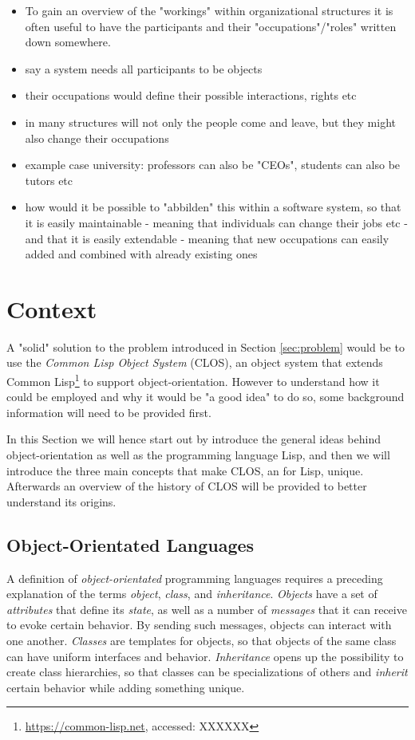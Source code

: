\documentclass[oribibl]{llncs}
\begin{document}
\begin{itemize}
\item To gain an overview of the "workings" within organizational structures it is often useful to have the participants and their "occupations"/"roles" written down somewhere. 
\item say a system needs all participants to be objects
\item their occupations would define their possible interactions, rights etc
\item in many structures will not only the people come and leave, but they might also change their occupations
\item example case university: professors can also be "CEOs", students can also be tutors etc
\item how would it be possible to "abbilden" this within a software system, so that it is easily maintainable - meaning that individuals can change their jobs etc - and that it is easily extendable - meaning that new occupations can easily added and combined with already existing ones
\end{itemize}


\section{Context}
\label{sec:context}
A "solid" solution to the problem introduced in Section \ref{sec:problem} would be to use the \emph{Common Lisp Object System} (CLOS), an object system that extends Common Lisp\footnote{\url{https://common-lisp.net}, accessed: XXXXXX} to support object-orientation. \cite{CLOSOverview} However to understand how it could be employed and why it would be "a good idea" to do so, some background information will need to be provided first.

In this Section we will hence start out by introduce the general ideas behind object-orientation as well as the programming language Lisp, and then we will introduce the three main concepts that make CLOS, an for Lisp, unique. Afterwards an overview of the history of CLOS will be provided to better understand its origins.

\subsection{Object-Orientated Languages}
\label{sec:oo}

A definition of \emph{object-orientated} programming languages requires a preceding explanation of the terms \emph{object}, \emph{class}, and \emph{inheritance}. \emph{Objects} have a set of \emph{attributes} that define its \emph{state}, as well as a number of \emph{messages} that it can receive to evoke certain behavior. By sending such messages, objects can interact with one another. \emph{Classes} are templates for objects, so that objects of the same class can have uniform interfaces and behavior. \emph{Inheritance} opens up the possibility to create class hierarchies, so that classes can be specializations of others and \emph{inherit} certain behavior while adding something unique. 
\end{document}
